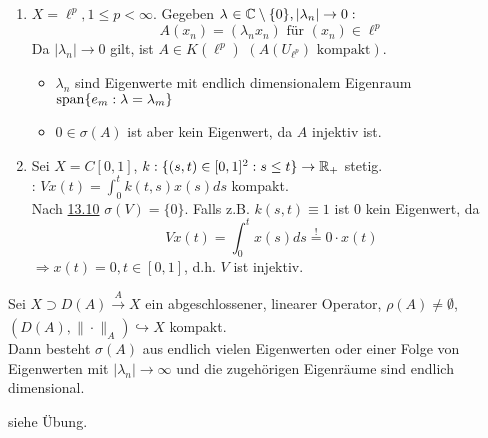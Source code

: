 \begin{beispiel}
	\begin{enumerate}[label=\alph*\upshape)]
		\item $X = \ell^{p}, 1 \leq p < \infty$. Gegeben $\lambda_{} \in \mathbb{C} \setminus \{ 0 \}, | \lambda_{n} | \rightarrow 0:$
			\[ A(x_{n}) = (\lambda_{n} x_{n}) \text{ für } (x_{n}) \in \ell^{p} \]
			Da $| \lambda_{n} | \rightarrow 0$ gilt, ist $A \in K(\ell^{p})$ $\left( A \left( U_{\ell^{p}} \right) \text{ kompakt} \right)$.
			\begin{itemize}
				\item $\lambda_{n}$  sind Eigenwerte mit endlich dimensionalem Eigenraum $\operatorname{span}\{ e_{m}: \lambda = \lambda_{m} \}$
				\item $0 \in \sigma(A)$ ist aber kein Eigenwert, da $A$ injektiv ist. 
			\end{itemize}
			
\newpage %

		\item Sei $X = C[0, 1]$, $k: \{ (s, t) \in [0, 1]^{2}: s \leq t \} \rightarrow \mathbb{R}_{+}$ stetig. \\
			: $V x(t) = \int_{0}^{t} k(t, s) x(s) ds$ kompakt. \\
			Nach \hyperref[bsp:13.10]{13.10} $\sigma(V) = \{ 0 \}$.
			Falls z.B. $k(s, t) \equiv 1$ ist $0$ kein Eigenwert, da 
			\[ V x(t) = \int_{0}^{t} x(s) ds \overset{!}{=} 0 \cdot x(t) \]
			$\Rightarrow x(t) = 0, t \in [0, 1]$, d.h. $V$ ist injektiv.
	\end{enumerate}	
\end{beispiel}


\begin{satz}
	Sei $X \supset D(A) \xrightarrow[]{A} X$ ein abgeschlossener, linearer Operator, $\rho(A) \neq \emptyset$, $(D(A), \| \cdot \|_{A}) \hookrightarrow X$ kompakt. \\
	Dann besteht $\sigma(A)$ aus endlich vielen Eigenwerten oder einer Folge von Eigenwerten mit $|\lambda_{n}| \rightarrow \infty$ und die zugehörigen Eigenräume sind endlich dimensional.
\end{satz}

\begin{beweis}
	siehe Übung.	
\end{beweis}



\newpage
